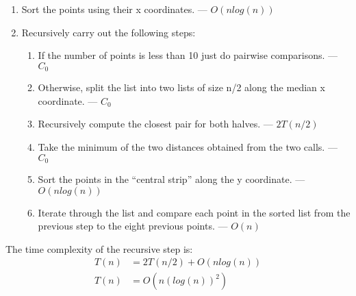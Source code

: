 \documentclass[12pt]{article}
\begin{document}
\begin{enumerate}
   \item Sort the points using their x coordinates. --- $O(nlog(n))$
   \item Recursively carry out the following steps:
   \begin{enumerate}
    \item If the number of points is less than 10 just do pairwise comparisons. --- $C_0$
    \item Otherwise, split the list into two lists of size n/2 along the median x coordinate. --- $C_0$
    \item Recursively compute the closest pair for both halves. --- $2T(n/2)$
    \item Take the minimum of the two distances obtained from the two calls. --- $C_0$
    \item Sort the points in the “central strip” along the y coordinate. --- $O(nlog(n))$
    \item Iterate through the list and compare each point in the sorted list from the previous step to the eight previous points. --- $O(n)$
   \end{enumerate}
\end{enumerate}

The time complexity of the recursive step is: 
\begin{equation}
\begin{aligned}
\nonumber
T(n)&=2T(n/2)+O(nlog(n)) \\
T(n)&=O(n(log(n))^2)
\end{aligned}
\end{equation}
\end{document}
